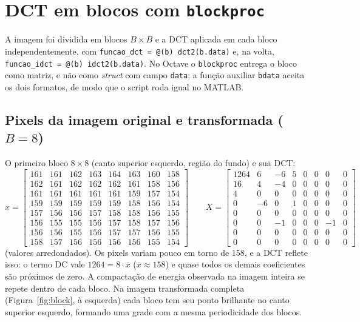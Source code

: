 \documentclass[11pt,a4paper]{article}
\begin{document}
\section{DCT em blocos com \texttt{blockproc}}

A imagem foi dividida em blocos $B\times B$ e a DCT aplicada em cada bloco
independentemente, com \texttt{funcao\_dct = @(b) dct2(b.data)} e, na volta,
\texttt{funcao\_idct = @(b) idct2(b.data)}. No Octave o \texttt{blockproc} entrega o
bloco como matriz, e não como \emph{struct} com campo \texttt{data}; a função auxiliar
\texttt{bdata} aceita os dois formatos, de modo que o script roda igual no MATLAB.

\subsection*{Pixels da imagem original e transformada ($B=8$)}

O primeiro bloco $8\times8$ (canto superior esquerdo, região do fundo) e sua DCT:
\[
x = \begin{bmatrix}
161 & 161 & 162 & 163 & 164 & 163 & 160 & 158\\
162 & 161 & 162 & 162 & 162 & 161 & 158 & 156\\
161 & 161 & 161 & 161 & 161 & 159 & 157 & 154\\
159 & 159 & 159 & 159 & 159 & 158 & 156 & 154\\
157 & 156 & 156 & 157 & 158 & 158 & 156 & 155\\
156 & 155 & 155 & 156 & 157 & 158 & 157 & 156\\
156 & 156 & 155 & 156 & 157 & 157 & 156 & 155\\
158 & 157 & 156 & 156 & 156 & 156 & 155 & 154
\end{bmatrix}
\qquad
X = \begin{bmatrix}
1264 & 6 & -6 & 5 & 0 & 0 & 0 & 0\\
16 & 4 & -4 & 0 & 0 & 0 & 0 & 0\\
4 & 0 & 0 & 0 & 0 & 0 & 0 & 0\\
0 & -6 & 0 & 1 & 0 & 0 & 0 & 0\\
0 & 0 & 0 & 0 & 0 & 0 & 0 & 0\\
0 & 0 & -1 & 0 & 0 & 0 & -1 & 0\\
0 & 0 & 0 & 0 & 0 & 0 & 0 & 0\\
0 & 0 & 0 & 0 & 0 & 0 & 0 & 0
\end{bmatrix}
\]
(valores arredondados). Os pixels variam pouco em torno de $158$, e a DCT reflete isso:
o termo DC vale $1264 = 8\cdot\bar{x}$ ($\bar{x}\approx158$) e quase todos os demais
coeficientes são próximos de zero. A compactação de energia observada na imagem inteira
se repete dentro de cada bloco. Na imagem transformada completa
(Figura~\ref{fig:block}, à esquerda) cada bloco tem seu ponto brilhante no canto
superior esquerdo, formando uma grade com a mesma periodicidade dos blocos.
\end{document}
